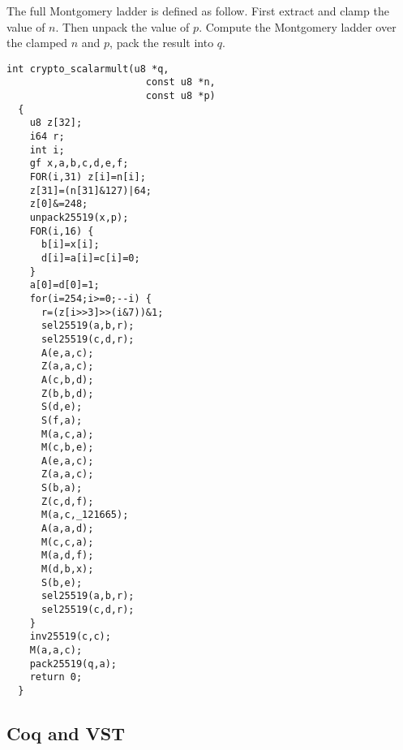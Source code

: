   The full Montgomery ladder is defined as follow.
  First extract and clamp the value of $n$. Then unpack the value of $p$.
  Compute the Montgomery ladder over the clamped $n$ and $p$, pack the result into $q$.
  \begin{lstlisting}[language=Ctweetnacl]
  int crypto_scalarmult(u8 *q,
                        const u8 *n,
                        const u8 *p)
  {
    u8 z[32];
    i64 r;
    int i;
    gf x,a,b,c,d,e,f;
    FOR(i,31) z[i]=n[i];
    z[31]=(n[31]&127)|64;
    z[0]&=248;
    unpack25519(x,p);
    FOR(i,16) {
      b[i]=x[i];
      d[i]=a[i]=c[i]=0;
    }
    a[0]=d[0]=1;
    for(i=254;i>=0;--i) {
      r=(z[i>>3]>>(i&7))&1;
      sel25519(a,b,r);
      sel25519(c,d,r);
      A(e,a,c);
      Z(a,a,c);
      A(c,b,d);
      Z(b,b,d);
      S(d,e);
      S(f,a);
      M(a,c,a);
      M(c,b,e);
      A(e,a,c);
      Z(a,a,c);
      S(b,a);
      Z(c,d,f);
      M(a,c,_121665);
      A(a,a,d);
      M(c,c,a);
      M(a,d,f);
      M(d,b,x);
      S(b,e);
      sel25519(a,b,r);
      sel25519(c,d,r);
    }
    inv25519(c,c);
    M(a,a,c);
    pack25519(q,a);
    return 0;
  }
  \end{lstlisting}

\subsection{Coq and VST}
